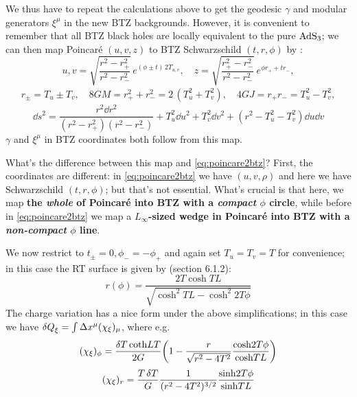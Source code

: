 \documentclass[11pt,a4paper]{article}
\begin{document}
	We thus have to repeat the calculations above to get the geodesic $\gamma$ and modular generators $\xi^\mu$ in the new BTZ backgrounds. However, it is convenient to remember that all BTZ black holes are locally equivalent to the pure $\mathrm{AdS}_3$; we can then map Poincar\'e $(u,v,z)$ to BTZ Schwarzschild $(t,r,\phi)$ by \cite{Hubeny:2007xt}:
	\begin{equation}
		u,v = \sqrt{\frac{r^2 - r_+^2}{r^2 - r_-^2}}\,
			e^{(\phi\pm t)\,2T_{u,v}},
	\quad
		z = \sqrt{\frac{r_+^2 - r_-^2}{r^2 - r_-^2}}\,
			e^{\phi r_+ + t r_-},
	\end{equation}
	\begin{gather}
		r_\pm = T_u \pm T_v,
	\quad
		8GM = r_+^2 + r_-^2
		= 2\,(T_u^2 + T_v^2),
	\quad
		4GJ = r_+ r_-
		= T_u^2 - T_v^2,
	\end{gather}
	\begin{equation}
		\dd{s}^2
		= \frac{r^2 \dd{r}^2}{
				(r^2 - r_+^2)
				(r^2 - r_-^2)
			}
			+ T_u^2 \dd{u}^2
			+ T_v^2 \dd{v}^2
			+ (r^2 - T_u^2 - T_v^2) \dd{u} \dd{v}
	\end{equation}
	$\gamma$ and $\xi^\mu$ in BTZ coordinates both follow from this map. 
	
	What's the difference between this map and \eqref{eq:poincare2btz}? First, the coordinates are different: in \eqref{eq:poincare2btz} we have $(u,v,\rho)$ and here we have Schwarzschild $(t,r,\phi)$; but that's not essential. What's crucial is that here, we map \textbf{the \textsl{whole} of Poincar\'e into BTZ with a \textsl{compact} $\phi$ circle}, while before in \eqref{eq:poincare2btz} we map a \textbf{$L_\infty$-sized wedge in Poincar\'e into BTZ with a \textsl{non-compact} $\phi$ line}. 
	
	We now restrict to $t_\pm = 0, \phi_- = -\phi_+$ and again set $T_u = T_v = T$ for convenience; in this case the RT surface is given by \textcite{Rangamani:2016dms} (section 6.1.2):
	\begin{equation}
		r(\phi) = \frac{2T\cosh TL}{
				\sqrt{\cosh^2 TL - \cosh^2 2T\phi}
			}
	\end{equation}
	The charge variation has a nice form under the above simplifications; in this case we have $
		\var{Q}_{\xi}
		= \int \Delta{x^\mu} (\chi_\xi)_\mu
	$, where e.g.
	\begin{equation}
		(\chi_\xi)_\phi
		= \frac{\var{T} \coth LT}{2G}
			\pqty{
				1 - {\frac{r}{\sqrt{r^2 - 4T^2}}}
				\frac{\cosh 2T\phi}{\cosh TL}
			}
	\end{equation}
	\begin{equation}
		(\chi_\xi)_r
		= \frac{T\var{T}}{G}
			\frac{1}{(r^2 - 4T^2)^{3/2}}
			\frac{\mathrm{sinh} 2T\phi}{\mathrm{sinh} TL}
	\end{equation}
	
\end{document}
